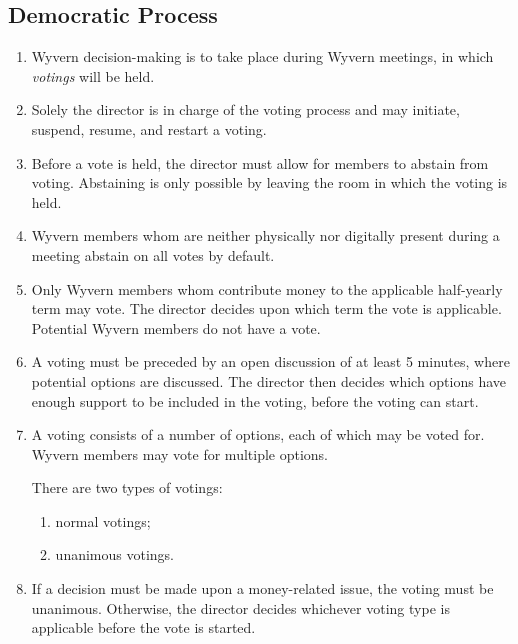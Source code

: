 \subsection{Democratic Process}
\begin{enumerate}
    \item Wyvern decision-making is to take place during Wyvern meetings, in which \emph{votings} will be held.

    \item Solely the director is in charge of the voting process and may initiate, suspend, resume, and restart a voting.

    \item Before a vote is held, the director must allow for members to abstain from voting. Abstaining is only possible by leaving the room in which the voting is held.
    
    \item Wyvern members whom are neither physically nor digitally present during a meeting abstain on all votes by default.

    \item Only Wyvern members whom contribute money to the applicable half-yearly term may vote. The director decides upon which term the vote is applicable. Potential Wyvern members do not have a vote.
    
    \item A voting must be preceded by an open discussion of at least 5 minutes, where potential options are discussed. The director then decides which options have enough support to be included in the voting, before the voting can start.
    
    \item A voting consists of a number of options, each of which may be voted for. Wyvern members may vote for multiple options.

    \begin{item}
        There are two types of votings:
        \begin{enumerate}
            \item normal votings;
            \item unanimous votings.
        \end{enumerate}
    \end{item}

    \item If a decision must be made upon a money-related issue, the voting must be unanimous. Otherwise, the director decides whichever voting type is applicable before the vote is started.


\end{enumerate}
